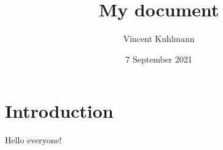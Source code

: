 \documentclass{article}
\title{My document}
\author{Vincent Kuhlmann}
\date{7 September 2021}
\begin{document}
\maketitle
\section{Introduction}

Hello everyone!
\end{document}
